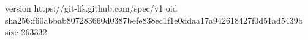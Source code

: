 version https://git-lfs.github.com/spec/v1
oid sha256:f60abbab807283660d0387befe838ec1f1e0ddaa17a942618427f0d51ad5439b
size 263332
